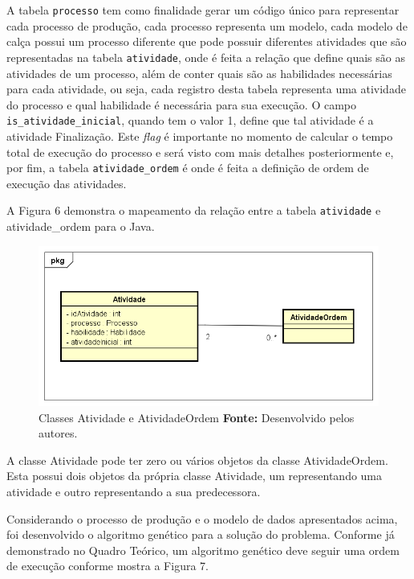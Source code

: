 \par A tabela \texttt{processo} tem como finalidade gerar um código único para representar 
cada processo de produção, cada processo representa um modelo, cada modelo
de calça possui um processo diferente que pode possuir diferentes atividades que
são representadas na tabela \texttt{atividade}, onde é feita a relação que define quais são as atividades de 
um processo,  além de conter quais são as habilidades necessárias para cada atividade, ou seja, cada registro desta 
tabela representa uma atividade do processo e qual habilidade é necessária para sua execução. O campo 
\texttt{is\_atividade\_inicial}, quando tem o valor 1, define que tal atividade
é a atividade Finalização. Este \textit{flag} é importante no momento de calcular o tempo total de execução do
processo e será visto com mais detalhes posteriormente e, por fim, a tabela
\texttt{atividade\_ordem} é onde é feita a definição de ordem de execução das
atividades.

\par A Figura 6 demonstra o mapeamento da relação entre a tabela
\texttt{atividade} e atividade\_ordem para o Java.

\newpage

\begin{figure}[h!]
	\centerline{\includegraphics[scale=0.7]{./imagens/atividade_diagram.png}}
	\caption[Classes Atividade e AtividadeOrdem]
	{Classes Atividade e AtividadeOrdem \textbf{Fonte:} Desenvolvido pelos
	autores.}
	\label{fig:exemplo1}
\end{figure} 

\par A classe Atividade pode ter zero ou vários objetos da classe
AtividadeOrdem.
Esta possui dois objetos da própria classe Atividade, um representando uma
atividade e outro representando a sua predecessora.

\par Considerando o processo de produção e o modelo de dados apresentados acima, foi
desenvolvido o algoritmo genético para a solução do problema. Conforme já demonstrado 
no Quadro Teórico, um algoritmo genético deve seguir uma ordem de execução conforme mostra
a Figura 7.



